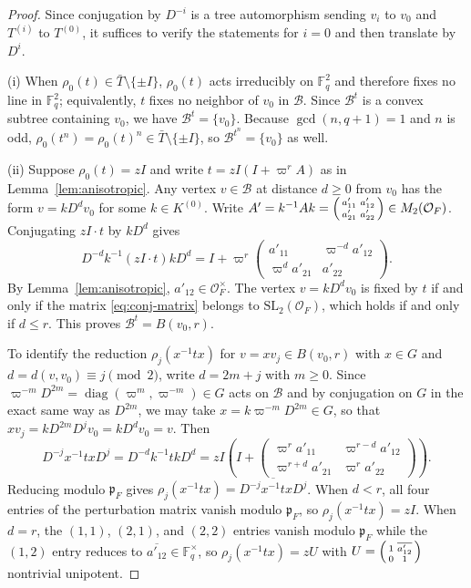 \documentclass[12pt, letterpaper]{article}
\numberwithin{equation}{section}
\theoremstyle{definition}
\theoremstyle{remark}
\newcommand{\OO}{\mathcal{O}_F}
\newcommand{\kk}{\mathbb{F}_q}
\begin{document}
\begin{proof}
Since conjugation by $D^{-i}$ is a tree automorphism sending $v_i$ to $v_0$ and $T^{(i)}$ to $T^{(0)}$, it suffices to verify the statements for $i=0$ and then translate by $D^i$.

(i) When $\rho_0(t)\in\bar{T}\setminus\{\pm I\}$, $\rho_0(t)$ acts irreducibly on $\kk^2$ and therefore fixes no line in $\kk^2$; equivalently, $t$ fixes no neighbor of $v_0$ in $\mathscr{B}$. Since $\mathscr{B}^t$ is a convex subtree containing $v_0$, we have $\mathscr{B}^t=\{v_0\}$. Because $\gcd(n,q+1)=1$ and $n$ is odd, $\rho_0(t^n)=\rho_0(t)^n\in\bar{T}\setminus\{\pm I\}$, so $\mathscr{B}^{t^n}=\{v_0\}$ as well.

(ii) Suppose $\rho_0(t)=zI$ and write $t=zI(I+\varpi^r A)$ as in Lemma~\ref{lem:anisotropic}. Any vertex $v\in\mathscr{B}$ at distance $d\ge 0$ from $v_0$ has the form $v=kD^d v_0$ for some $k\in K^{(0)}$. Write $A'=k^{-1}Ak=\begin{psmallmatrix}a'_{11}&a'_{12}\\ a'_{21}&a'_{22}\end{psmallmatrix}\in M_2(\OO)$. Conjugating $zI\cdot t$ by $kD^d$ gives
\begin{equation}\label{eq:conj-matrix}
 D^{-d}k^{-1}(zI\cdot t)kD^d
 =I+\varpi^r\begin{pmatrix}a'_{11}&\varpi^{-d}a'_{12}\\ \varpi^d a'_{21}&a'_{22}\end{pmatrix}.
\end{equation}
By Lemma~\ref{lem:anisotropic}, $a'_{12}\in\OO^\times$. The vertex $v=kD^d v_0$ is fixed by $t$ if and only if the matrix \eqref{eq:conj-matrix} belongs to $\mathrm{SL}_2(\OO)$, which holds if and only if $d\le r$. This proves $\mathscr{B}^t=B(v_0,r)$.

To identify the reduction $\rho_j(x^{-1}tx)$ for $v=xv_j\in B(v_0,r)$ with $x\in G$ and $d=d(v,v_0)\equiv j\pmod{2}$, write $d=2m+j$ with $m\ge 0$. Since $\varpi^{-m}D^{2m}=\operatorname{diag}(\varpi^m,\varpi^{-m})\in G$ acts on $\mathscr{B}$ and by conjugation on $G$ in the exact same way as $D^{2m}$, we may take $x=k\varpi^{-m}D^{2m}\in G$, so that $xv_j=kD^{2m}D^j v_0=kD^d v_0=v$. Then
\[
 D^{-j}x^{-1}txD^j=D^{-d}k^{-1}tkD^d
 =zI\left(I+\begin{pmatrix}\varpi^r a'_{11}&\varpi^{r-d}a'_{12}\\ \varpi^{r+d}a'_{21}&\varpi^r a'_{22}\end{pmatrix}\right).
\]
Reducing modulo $\mathfrak{p}_F$ gives $\rho_j(x^{-1}tx)=\overline{D^{-j}x^{-1}txD^j}$. When $d<r$, all four entries of the perturbation matrix vanish modulo $\mathfrak{p}_F$, so $\rho_j(x^{-1}tx)=zI$. When $d=r$, the $(1,1)$, $(2,1)$, and $(2,2)$ entries vanish modulo $\mathfrak{p}_F$ while the $(1,2)$ entry reduces to $\overline{a'_{12}}\in\kk^\times$, so $\rho_j(x^{-1}tx)=zU$ with $U=\begin{psmallmatrix}1&\overline{a'_{12}}\\ 0&1\end{psmallmatrix}$ nontrivial unipotent.


\end{proof}
\end{document}
